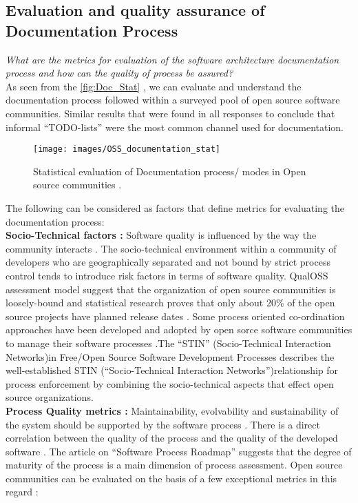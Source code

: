 \subsection{Evaluation and quality assurance of Documentation Process}
\indent \emph{What are the metrics for evaluation of the software architecture documentation process and how can the quality of process be assured?}
\\\indent As seen from the \autoref{fig:Doc_Stat} \cite{Zhao2003}, we can evaluate and understand the documentation process followed within a surveyed pool of open source software communities. Similar results that were found in all responses to conclude that informal \enquote{TODO-lists} were the most common channel used for documentation.
\begin{figure}[H] 
  \centering
  \texttt{[image: images/OSS\_documentation\_stat]}
  \caption[Statistical evaluation of Documentation process/ modes in Open source communities]{Statistical evaluation of Documentation process/ modes in Open source communities \cite{Zhao2003}.}\label{fig:Doc_Stat}
\end{figure}
\indent The following can be considered as factors that define metrics for evaluating the documentation process:
\\\indent \textbf{Socio-Technical factors : } Software quality is influenced by the way the community interacts \cite{Mens2011}. The socio-technical environment within a community of developers who are geographically separated and not bound by strict process control tends to introduce risk factors in terms of software quality. QualOSS assessment model \cite{5314237} suggest that the organization of open source communities is loosely-bound and statistical research \cite{Zhao2003} proves that only about 20\% of the open source projects have planned release dates . Some process oriented co-ordination approaches have been developed and adopted by open sorce software communities to manage their software processes .The \enquote{STIN} (Socio-Technical Interaction Networks)in Free/Open Source Software Development Processes \cite{SPM_2005} describes the well-established STIN (\enquote{Socio-Technical Interaction Networks})relationship for process enforcement by combining the socio-technical aspects that effect open source organizations. 
\\\indent \textbf{Process Quality metrics : } Maintainability, evolvability and sustainability of the system should be supported by the software process \cite{BachmannDocumentingSoftware2010} \cite{5314237}. There is a direct correlation between the quality of the process and the quality of the developed software \cite{Fuggeffa1988}. The article on \enquote{Software Process Roadmap} \cite{Fuggeffa1988} suggests that the degree of maturity of the process is a main dimension of process assessment. Open source communities can be evaluated on the basis of a few exceptional metrics in this regard \cite{Zhao2003} :
